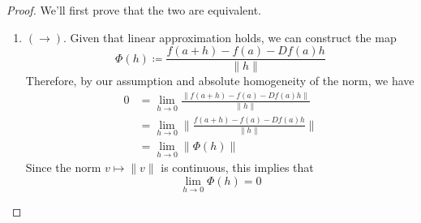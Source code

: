   \begin{proof}
		We'll first prove that the two are equivalent. 
		\begin{enumerate}
		  \item $(\rightarrow)$. Given that linear approximation holds, we can construct the map 
				\begin{equation}
					\Phi(h) \coloneqq \frac{f(a + h) - f(a) - Df(a) h}{\|h\|}
				\end{equation}
				Therefore, by our assumption and absolute homogeneity of the norm, we have 
				\begin{align}
					0 & = \lim_{h \to 0} \frac{\|f(a + h) - f(a) - Df(a) h\|}{\|h\|} \\ 
						& = \lim_{h \to 0} \bigg\| \frac{f(a + h) - f(a) - Df(a) h}{\|h\|} \bigg\| \\ 
						& = \lim_{h \to 0} \|\Phi(h)\|
				\end{align}
				Since the norm $v \mapsto \|v\|$ is continuous, this implies that 
				\begin{equation}
					\lim_{h \to 0} \Phi(h) = 0
				\end{equation}


\end{enumerate}
\end{proof}
